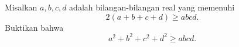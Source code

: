 Misalkan $a, b, c, d$ adalah bilangan-bilangan real yang memenuhi
\[
2(a + b + c + d) \ge abcd.
\]
Buktikan bahwa
\[
a^2 + b^2 + c^2 + d^2 \ge abcd.
\]
